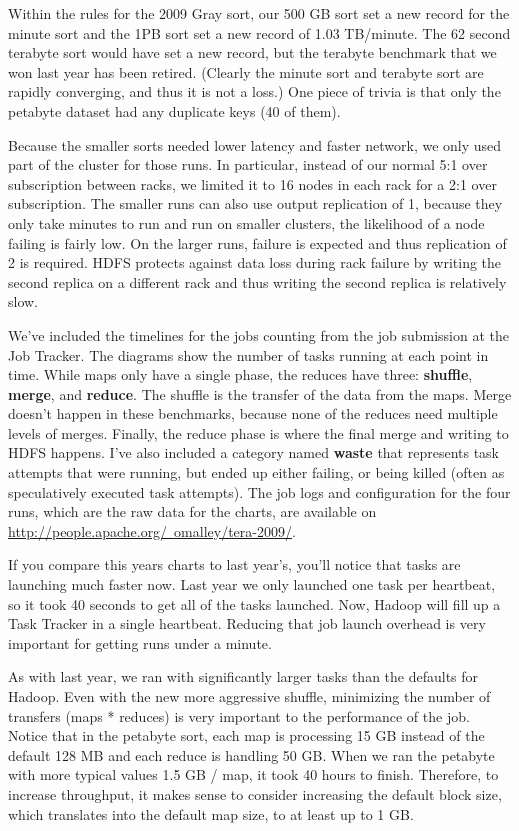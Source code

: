 \documentclass{article}
\begin{document}
Within the rules for the 2009 Gray sort, our 500 GB sort set a new
record for the minute sort and the 1PB sort set a new record of 1.03
TB/minute. The 62 second terabyte sort would have set a new record,
but the terabyte benchmark that we won last year has been
retired. (Clearly the minute sort and terabyte sort are rapidly
converging, and thus it is not a loss.)  One piece of trivia is that
only the petabyte dataset had any duplicate keys (40 of them).

Because the smaller sorts needed lower latency and faster network, we
only used part of the cluster for those runs. In particular, instead
of our normal 5:1 over subscription between racks, we limited it to 16
nodes in each rack for a 2:1 over subscription. The smaller runs can
also use output replication of 1, because they only take minutes to
run and run on smaller clusters, the likelihood of a node failing is
fairly low. On the larger runs, failure is expected and thus
replication of 2 is required. HDFS protects against data loss during
rack failure by writing the second replica on a different rack and
thus writing the second replica is relatively slow.

We've included the timelines for the jobs counting from the job
submission at the Job Tracker. The diagrams show the number of tasks
running at each point in time. While maps only have a single phase,
the reduces have three: \textbf{shuffle}, \textbf{merge}, and
\textbf{reduce}. The shuffle is the transfer of the data from the
maps. Merge doesn't happen in these benchmarks, because none of the
reduces need multiple levels of merges. Finally, the reduce phase is
where the final merge and writing to HDFS happens. I've also included
a category named \textbf{waste} that represents task attempts that
were running, but ended up either failing, or being killed (often as
speculatively executed task attempts). The job logs and configuration
for the four runs, which are the raw data for the charts, are
available on
\href{http://people.apache.org/~omalley/tera-2009/}{http://people.apache.org/~omalley/tera-2009/}.

If you compare this years charts to last year's, you'll notice that
tasks are launching much faster now. Last year we only launched one
task per heartbeat, so it took 40 seconds to get all of the tasks
launched. Now, Hadoop will fill up a Task Tracker in a single
heartbeat. Reducing that job launch overhead is very important
for getting runs under a minute.

As with last year, we ran with significantly larger tasks than the
defaults for Hadoop. Even with the new more aggressive shuffle,
minimizing the number of transfers (maps * reduces) is very important
to the performance of the job. Notice that in the petabyte sort, each
map is processing 15 GB instead of the default 128 MB and each reduce
is handling 50 GB. When we ran the petabyte with more typical values
1.5 GB / map, it took 40 hours to finish. Therefore, to increase
throughput, it makes sense to consider increasing the default block
size, which translates into the default map size, to at least up to 1
GB.
\end{document}
